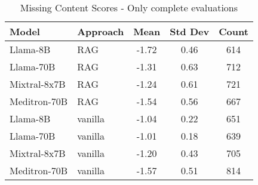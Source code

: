 \begin{table}[h]
\centering
\begin{tabular}{llccc}
\toprule
Model & Approach & Mean & Std Dev & Count \\
\midrule
Llama-8B & RAG & -1.72 & 0.46 & 614 \\
Llama-70B & RAG & -1.31 & 0.63 & 712 \\
Mixtral-8x7B & RAG & -1.24 & 0.61 & 721 \\
Meditron-70B & RAG & -1.54 & 0.56 & 667 \\
Llama-8B & vanilla & -1.04 & 0.22 & 651 \\
Llama-70B & vanilla & -1.01 & 0.18 & 639 \\
Mixtral-8x7B & vanilla & -1.20 & 0.43 & 705 \\
Meditron-70B & vanilla & -1.57 & 0.51 & 814 \\
\bottomrule
\end{tabular}
\caption{Missing Content Scores - Only complete evaluations}
\label{tab:missing_content_complete}
\end{table}